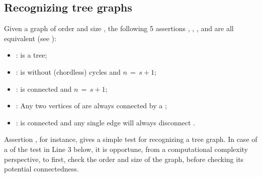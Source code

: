 \documentclass[a4paper,12pt,english]{sphinxhowto}
\begin{document}
\subsection{Recognizing tree graphs}
\label{\detokenize{tutorial:recognizing-tree-graphs}}
Given a graph  of order  and size , the following 5 assertions , , ,  and  are all equivalent (see ):
\begin{itemize}
\item {} 
:  is a tree;

\item {} 
:  is without (chordless) cycles and \(n \,=\, s + 1\);

\item {} 
:  is connected and \(n \,=\, s + 1\);

\item {} 
: Any two vertices of  are always connected by a ;

\item {} 
:  is connected and  any single edge will always disconnect .

\end{itemize}

Assertion , for instance, gives a simple test for recognizing a tree graph. In case of a  of the test in Line 3 below, it is opportune, from a computational complexity perspective, to first, check the order and size of the graph, before checking its potential connectedness.
\end{document}
